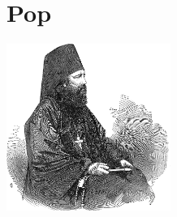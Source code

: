 \documentclass[11pt, twoside]{book}
\let\clearpage\relax
\begin{document}
\chapter{Pop}
\begin{center}
    \includegraphics[width=0.4\textwidth]{images/pop.png}
\end{center}
\pagestyle{pop}






\clearpage{\mbox{}\pagestyle{empty}\cleardoublepage}
\end{document}
